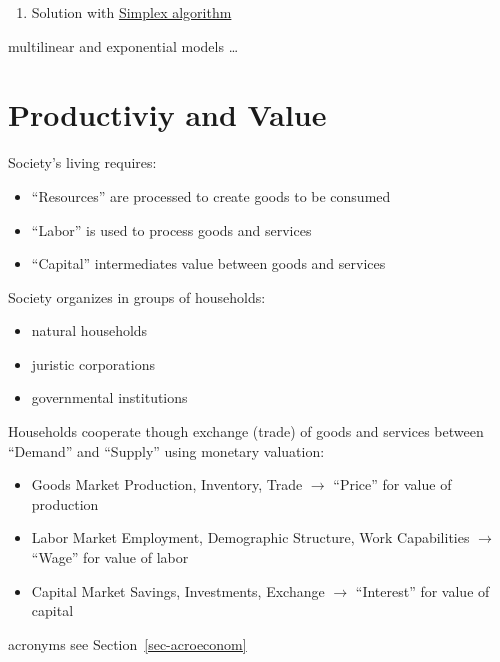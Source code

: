 \documentclass[
  letterpaper,
  DIV=11,
  numbers=noendperiod]{scrartcl}
\providecommand{\tightlist}{%
  \setlength{\itemsep}{0pt}\setlength{\parskip}{0pt}}
\begin{document}
\begin{enumerate}
\def\labelenumi{\arabic{enumi}.}
\setcounter{enumi}{3}
\tightlist
\item
  Solution with
  \href{https://cbom.atozmath.com/CBOM/Simplex.aspx?q=sm}{Simplex
  algorithm}
\end{enumerate}

multilinear and exponential models \ldots{}

\hfill\break
\hfill\break

\section{Productiviy and Value}\label{sec-productivityvalue}

Society's living requires:

\begin{itemize}
\tightlist
\item
  ``Resources'' are processed to create goods to be consumed
\item
  ``Labor'' is used to process goods and services
\item
  ``Capital'' intermediates value between goods and services
\end{itemize}

Society organizes in groups of households:

\begin{itemize}
\tightlist
\item
  natural households
\item
  juristic corporations
\item
  governmental institutions
\end{itemize}

Households cooperate though exchange (trade) of goods and services
between ``Demand'' and ``Supply'' using monetary valuation:

\begin{itemize}
\tightlist
\item
  Goods Market Production, Inventory, Trade \(\rightarrow\) ``Price''
  for value of production
\item
  Labor Market Employment, Demographic Structure, Work Capabilities
  \(\rightarrow\) ``Wage'' for value of labor
\item
  Capital Market Savings, Investments, Exchange \(\rightarrow\)
  ``Interest'' for value of capital
\end{itemize}

\hfill\break
acronyms see Section~\ref{sec-acroeconom}\\
\strut \\
\end{document}
